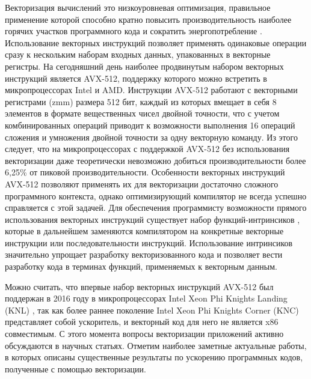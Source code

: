 
Векторизация вычислений это низкоуровневая оптимизация, правильное применение которой способно кратно повысить производительность наиболее горячих участков программного кода и сократить энергопотребление \cite{Cebrian2019VecScal}.
Использование векторных инструкций позволяет применять одинаковые операции сразу к нескольким наборам входных данных, упакованных в векторные регистры.
На сегодняшний день наиболее продвинутым набором векторных инструкций является AVX-512\label{abbr:avx}, поддержку которого можно встретить в микропроцессорах Intel и AMD\label{abbr:amd}.
Инструкции AVX-512 работают с векторными регистрами (zmm) размера 512 бит, каждый из которых вмещает в себя 8 элементов в формате вещественных чисел двойной точности, что с учетом комбинированных операций приводит к возможности выполнения 16 операций сложения и умножения двойной точности за одну векторную команду.
Из этого следует, что на микропроцессорах с поддержкой AVX-512 без использования векторизации даже теоретически невозможно добиться производительности более 6,25\% от пиковой производительности.
Особенности векторных инструкций AVX-512 позволяют применять их для векторизации достаточно сложного программного контекста, однако оптимизирующий компилятор не всегда успешно справляется с этой задачей.
Для обеспечения программисту возможности прямого использования векторных инструкций существует набор функций-интринсиков \cite{IntelIntrinsicsGuide}\label{term:intrinsic}, которые в дальнейшем заменяются компилятором на конкретные векторные инструкции или последовательности инструкций.
Использование интринсиков значительно упрощает разработку векторизованного кода и позволяет вести разработку кода в терминах функций, применяемых к векторным данным.

Можно считать, что впервые набор векторных инструкций AVX-512 был поддержан в 2016 году в микропроцессорах Intel Xeon Phi Knights Landing (KNL)\label{abbr:knl5} \cite{Jeffers2016KNL}, так как более раннее поколение Intel Xeon Phi Knights Corner (KNC)\label{abbr:knc} представляет собой ускоритель, и векторный код для него не является x86 совместимым.
С этого момента вопросы векторизации приложений активно обсуждаются в научных статьях.
Отметим наиболее заметные актуальные работы, в которых описаны существенные результаты по ускорению программных кодов, полученные с помощью векторизации.

